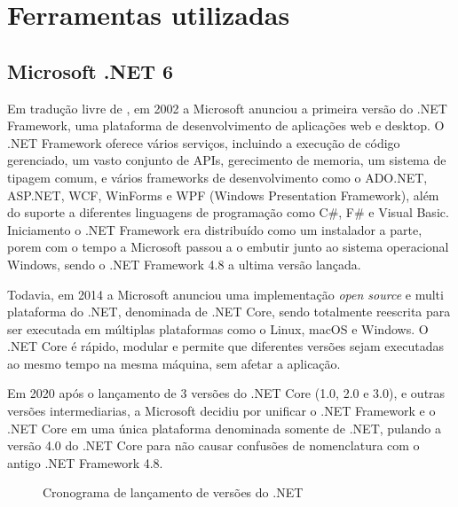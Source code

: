 \section{Ferramentas utilizadas}\label{sec:fundamental}
\subsection{Microsoft .NET 6}

Em tradução livre de \cite{Akella:2022}, em 2002 a Microsoft anunciou a primeira
versão do .NET Framework, uma plataforma de desenvolvimento de aplicações
web e desktop. O .NET Framework oferece vários serviços, incluindo a
execução de código gerenciado, um vasto conjunto de APIs, gerecimento
de memoria, um sistema de tipagem comum, e vários frameworks de desenvolvimento
como o ADO.NET, ASP.NET, WCF, WinForms e WPF (Windows Presentation Framework),
além do suporte a diferentes linguagens de programação como C\#, F\# e Visual Basic.
Iniciamento o .NET Framework era distribuído como um instalador a parte, porem
com o tempo a Microsoft passou a o embutir junto ao sistema operacional Windows,
sendo o .NET Framework 4.8 a ultima versão lançada.

Todavia, em 2014 a Microsoft anunciou uma implementação \emph{open source} e
multi plataforma do .NET, denominada de .NET Core, sendo totalmente reescrita
para ser executada em múltiplas plataformas como o Linux, macOS e Windows.
O .NET Core é rápido, modular e permite que diferentes versões sejam
executadas ao mesmo tempo na mesma máquina, sem afetar a aplicação.

Em 2020 após o lançamento de 3 versões do .NET Core (1.0, 2.0 e 3.0), e outras
versões intermediarias, a Microsoft decidiu por unificar o .NET Framework e o
.NET Core em uma única plataforma denominada somente de .NET, pulando a
versão 4.0 do .NET Core para não causar confusões de nomenclatura
com o antigo .NET Framework 4.8.

\begin{figure}[H]
    \caption{Cronograma de lançamento de versões do .NET}
    \centering
    \label{fig:dotnet-release-schedule}
\end{figure}


